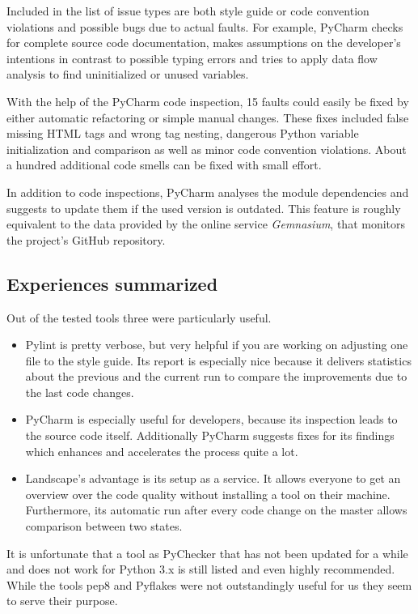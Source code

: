 Included in the list of issue types are both style guide or code convention violations and possible bugs due to actual faults.
For example, PyCharm checks for complete source code documentation, makes assumptions on the developer's intentions in contrast to possible typing errors and tries to apply data flow analysis to find uninitialized or unused variables.

With the help of the PyCharm code inspection, 15 faults could easily be fixed by either automatic refactoring or simple manual changes.
These fixes included false missing HTML tags and wrong tag nesting, dangerous Python variable initialization and comparison as well as minor code convention violations.
About a hundred additional code smells can be fixed with small effort.

In addition to code inspections, PyCharm analyses the module dependencies and suggests to update them if the used version is outdated.
This feature is roughly equivalent to the data provided by the online service \textit{Gemnasium}, that monitors the project's GitHub repository.

\subsection{Experiences summarized}
Out of the tested tools three were particularly useful.

\begin{itemize}
    \item Pylint is pretty verbose, but very helpful if you are working on adjusting one file to the style guide.
    Its report is especially nice because it delivers statistics about the previous and the current run to compare the improvements due to the last code changes.
    \item PyCharm is especially useful for developers, because its inspection leads to the source code itself.
    Additionally PyCharm suggests fixes for its findings which enhances and accelerates the process quite a lot.
    \item Landscape's advantage is its setup as a service. It allows everyone to get an overview over the code quality without installing a tool on their machine. Furthermore, its automatic run after every code change on the master allows comparison between two states.
\end{itemize}

It is unfortunate that a tool as PyChecker that has not been updated for a while and does not work for Python 3.x is still listed and even highly recommended.  
While the tools pep8 and Pyflakes were not outstandingly useful for us they seem to serve their purpose.

